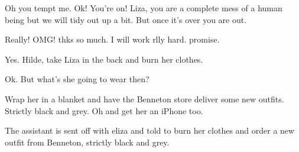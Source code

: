 Oh you tempt me.  Ok!  You're on!  Liza, you are a complete mess of a human being but we will tidy out up a bit.  But once it's over you are out.  

 Really!  OMG!  thks so much.  I will work rlly hard.  promise.

 Yes.  Hilde, take Liza in the back and burn her clothes.

 Ok.  But what's she going to wear then?

 Wrap her in a blanket and have the Benneton store deliver some new outfits.  Strictly black and grey.  Oh and get her an iPhone too.


The assistant is sent off with eliza and told to burn her clothes and order a new outfit from Benneton, strictly black and grey.
